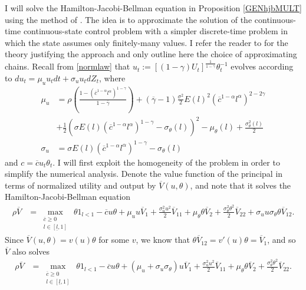 \documentclass[11pt]{article}
\theoremstyle{plain}
\begin{document}
I will solve the Hamilton-Jacobi-Bellman equation in Proposition \ref{GENhjbMULT} using the method of \cite{kushner_numerical_2001}. The idea is to approximate the solution of the continuous-time continuous-state control problem with a simpler discrete-time problem in which the state assumes only finitely-many values. I refer the reader to \cite{kushner_numerical_2001} for the theory justifying the approach and only outline here the choice of approximating chains. Recall from \eqref{normlaw} that $u_t := [(1-\gamma)U_t]^{\frac{1}{1-\overline{\gamma}}}\theta_t^{-1}$ evolves according to $du_t = \mu_uu_tdt + \sigma_uu_tdZ_t$, where
\begin{equation}
\begin{aligned}
\mu_u & = \rho {\left(\frac{1 - (\overline{c}^{1-\alpha}l^{\alpha})^{1-\gamma}}{1-\overline{\gamma}}\right)}  + (\overline{\gamma}-1)\frac{\sigma^2}{2} E(l)^2(\overline{c}^{1-\alpha}l^{\alpha})^{2-2\gamma} 
\\ & + \frac{1}{2}(\sigma E(l)(\overline{c}^{1-\alpha}l^{\alpha})^{1-\gamma}-\sigma_{\theta}(l))^2 - \mu_{\theta}(l) + \frac{\sigma_{\theta}^2(l)}{2}
\\ \sigma_u & = \sigma E(l)(\overline{c}^{1-\alpha}l^{\alpha})^{1-\gamma} - \sigma_{\theta}(l)
\label{recall_mu}
\end{aligned} 
\end{equation}
and $c = \overline{c}u_t\theta_t$. I will first exploit the homogeneity of the problem in order to simplify the numerical analysis. Denote the value function of the principal in terms of normalized utility and output by $\overline{V}(u,\theta)$, and note that it solves the Hamilton-Jacobi-Bellman equation
\begin{equation}
\begin{aligned}
\rho \overline{V} & = \max_{\substack{\overline{c} \geq 0 \\ l \in [\underline{l}, 1]}} \ \theta 1_{l<1} - \overline{c}u\theta + \mu_uu\overline{V}_1 + \frac{\sigma_u^2u^2}{2}\overline{V}_{11} + \mu_{\theta}\theta\overline{V}_2 + \frac{\sigma_{\theta}^2 \theta^2}{2}\overline{V}_{22}+ \sigma_uu \sigma_{\theta}\theta \overline{V}_{12}.
\label{origHJB4}
\end{aligned}
\end{equation}
Since $\overline{V}(u,\theta) = v(u)\theta$ for some $v$, we know that $\theta\overline{V}_{12} = v'(u)\theta = \overline{V}_1$, and so $\overline{V}$ also solves\begin{equation}
\begin{aligned}
\rho \overline{V} & = \max_{\substack{\overline{c} \geq 0 \\ l \in [\underline{l}, 1]}} \ \theta 1_{l<1}  - \overline{c}u\theta + (\mu_u + \sigma_u \sigma_{\theta})u\overline{V}_1 + \frac{\sigma_u^2u^2}{2}\overline{V}_{11} + \mu_{\theta}\theta\overline{V}_2 + \frac{\sigma_{\theta}^2 \theta^2}{2}\overline{V}_{22}.
\label{origHJB5}
\end{aligned}
\end{equation}
\end{document}
